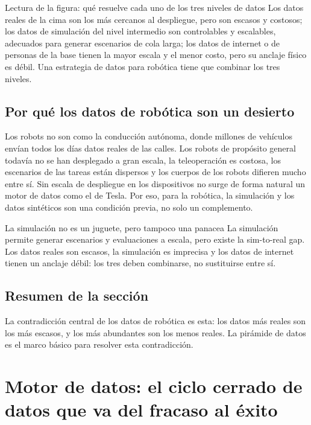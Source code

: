 \documentclass[a4paper]{article}
\begin{document}
\begin{knowledgebox}{Lectura de la figura: qué resuelve cada uno de los tres niveles de datos}
Los datos reales de la cima son los más cercanos al despliegue, pero son escasos y costosos; los datos de simulación del nivel intermedio son controlables y escalables, adecuados para generar escenarios de cola larga; los datos de internet o de personas de la base tienen la mayor escala y el menor costo, pero su anclaje físico es débil. Una estrategia de datos para robótica tiene que combinar los tres niveles.
\end{knowledgebox}

\subsection{Por qué los datos de robótica son un desierto}

Los robots no son como la conducción autónoma, donde millones de vehículos envían todos los días datos reales de las calles. Los robots de propósito general todavía no se han desplegado a gran escala, la teleoperación es costosa, los escenarios de las tareas están dispersos y los cuerpos de los robots difieren mucho entre sí. Sin escala de despliegue en los dispositivos no surge de forma natural un motor de datos como el de Tesla. Por eso, para la robótica, la simulación y los datos sintéticos son una condición previa, no solo un complemento.

\begin{warningbox}{La simulación no es un juguete, pero tampoco una panacea}
La simulación permite generar escenarios y evaluaciones a escala, pero existe la sim-to-real gap. Los datos reales son escasos, la simulación es imprecisa y los datos de internet tienen un anclaje débil: los tres deben combinarse, no sustituirse entre sí.
\end{warningbox}

\subsection{Resumen de la sección}

La contradicción central de los datos de robótica es esta: los datos más reales son los más escasos, y los más abundantes son los menos reales. La pirámide de datos es el marco básico para resolver esta contradicción.

\section{Motor de datos: el ciclo cerrado de datos que va del fracaso al éxito}
\end{document}
